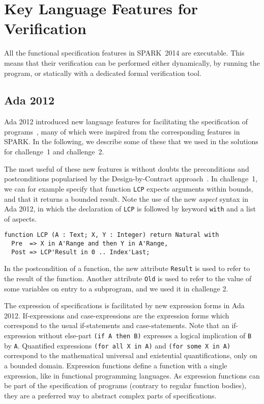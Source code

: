 \documentclass[sttt,draft]{svjour}
\newcommand{\newspark}{SPARK~2014\xspace}
\begin{document}
\section{Key Language Features for Verification}
\label{langfeatures}

All the functional specification features in \newspark are executable. This
means that their verification can be performed either dynamically, by running
the program, or statically with a dedicated formal verification tool.

\subsection{Ada 2012}

Ada 2012 introduced new language features for facilitating the specification of
programs~\cite{ada2012rationale}, many of which were inspired from the
corresponding features in SPARK. In the following, we describe some of these
that we used in the solutions for challenge~1 and challenge~2.

The most useful of these new features is without doubts the preconditions and
postconditions popularised by the Design-by-Contract
approach~\cite{meyer:1988:OSC}. In challenge~1, we can for example specify that
function \verb|LCP| expects arguments within bounds, and that it returns a
bounded result. Note the use of the new \textit{aspect} syntax in Ada 2012, in
which the declaration of \verb|LCP| is followed by keyword \verb|with| and a
list of aspects.

\begin{footnotesize}
\begin{verbatim}
function LCP (A : Text; X, Y : Integer) return Natural with
  Pre  => X in A'Range and then Y in A'Range,
  Post => LCP'Result in 0 .. Index'Last;
\end{verbatim}
\end{footnotesize}

In the postcondition of a function, the new attribute \verb|Result| is used to
refer to the result of the function. Another attribute \verb|Old| is used to
refer to the value of some variables on entry to a subprogram, and we used it
in challenge 2.

The expression of specifications is facilitated by new expression forms in Ada
2012. If-expressions and case-expressions are the expression forms which
correspond to the usual if-statements and case-statements. Note that an
if-expression without else-part \verb|(if A then B)| expresses a logical
implication of \verb|B| by \verb|A|. Quantified expressions
\verb|(for all X in A)| and \verb|(for some X in A)| correspond to the
mathematical universal and existential quantifications, only on a bounded
domain. Expression functions define a function with a single expression, like
in functional programming languages. As expression functions can be part of the
specification of programs (contrary to regular function bodies), they are a
preferred way to abstract complex parts of specifications.
\end{document}
